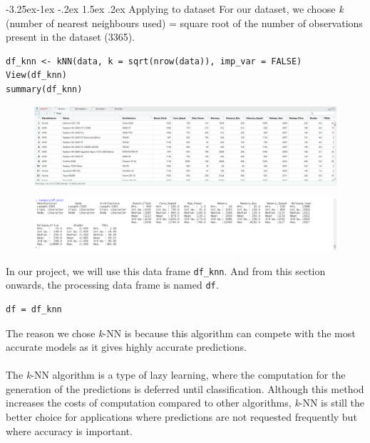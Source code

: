 \documentclass[a4paper]{article}
\makeatletter
\newcounter {subsubsubsection}[subsubsection]
\newcommand\subsubsubsection{\@startsection{subsubsubsection}{4}{\z@}%
                                     {-3.25ex\@plus -1ex \@minus -.2ex}%
                                     {1.5ex \@plus .2ex}%
                                     {\normalfont\normalsize\bfseries}}
\makeatother
\begin{document}
\subsubsubsection{Applying to dataset}
For our dataset, we choose \textit{k} (number of nearest neighbours used) = square root of the number of observations present in the dataset (3365). 
\begin{mdframed}[leftline=false,rightline=false,backgroundcolor=lightblue!10,nobreak=false]
    \begin{verbatim}
df_knn <- kNN(data, k = sqrt(nrow(data)), imp_var = FALSE)
View(df_knn)
summary(df_knn)
    \end{verbatim}
\end{mdframed}
\begin{figure}[H]
    \centering
    \includegraphics[keepaspectratio, width=1\textwidth, height=1\textheight]{Clean/df_knn.png}
\end{figure}
\begin{figure}[H]
    \centering
    \includegraphics[keepaspectratio, width=1\textwidth, height=1\textheight]{Clean/df_knn_summary.png}
\end{figure}
In our project, we will use this data frame \verb|df_knn|. And from this section onwards, the processing data frame is named \verb|df|.
\begin{mdframed}[leftline=false,rightline=false,backgroundcolor=lightblue!10,nobreak=false]
    \begin{verbatim}
df = df_knn
    \end{verbatim}
\end{mdframed}
The reason we chose \textit{k}-NN is because this algorithm can compete with the most accurate models as it gives highly accurate predictions.\\\\
The \textit{k}-NN algorithm is a type of lazy learning, where the computation for the generation of the predictions is deferred until classification. Although this method increases the costs of computation compared to other algorithms, \textit{k}-NN is still the better choice for applications where predictions are not requested frequently but where accuracy is important.
\end{document}
